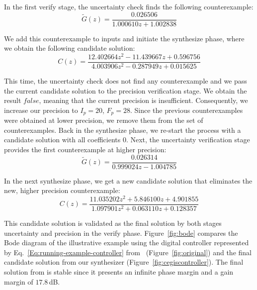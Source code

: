 \documentclass[final]{sig-alternate-05-2015}
\newcommand{\red}[1]{{\color{red}#1}}
\begin{document}
In the first {\sc verify} stage, the {\sc uncertainty} 
check finds the following counterexample:
%
$$ \tilde G(z) = \frac{0.026506}{1.000610z+1.002838} $$


We add this counterexample to {\sc inputs} and initiate the {\sc synthesize}
phase, where we obtain the following candidate solution:
%
$$
C(z)=\frac{12.402664z^2{-}11.439667z{+}0.596756}{4.003906z^2{-}0.287949z{+}0.015625}
$$

This time, the {\sc uncertainty} check does not find any
counterexample and we pass the current candidate solution to the {\sc
precision} verification stage.
%
%
We obtain the result $\mathit{false}$, meaning that the current precision is
insufficient.  Consequently, we increase our precision to $I_p=20$, $F_p=28$.
%
Since the previous counterexamples were obtained at lower precision, we
remove them from the set of counterexamples.  Back in the {\sc synthesize}
phase, we re-start the process with a candidate solution with all
coefficients $0$.  Next, the {\sc uncertainty} verification stage provides
the first counterexample at higher precision:
%
$$ \tilde G(z) = \frac{0.026314}{0.999024z{-}1.004785} $$

In the next {\sc synthesize} phase, we get a new candidate solution that
eliminates the new, higher precision counterexample:
%
$$ C(z)=\frac{11.035202z^2{+}5.846100z{+}4.901855}{1.097901z^2{+}0.063110z{+}0.128357} $$
%

This candidate solution is validated as the final solution by both stages
{\sc uncertainty} and {\sc precision} in the {\sc verify} phase. 
Figure~\ref{fig:bode} compares the Bode diagram of the illustrative example
using the digital controller represented by
Eq.~\eqref{Eq:running-example-controller}
from~\cite{DBLP:conf/hybrid/WangGRJF16} (Figure~\ref{fig:original}) and the
final candidate solution from our synthesizer
(Figure~\ref{fig:cegiscontroller}).  The final solution from \tool is stable
since it presents an infinite phase margin and a gain margin of $17.8$\,dB.
\end{document}
